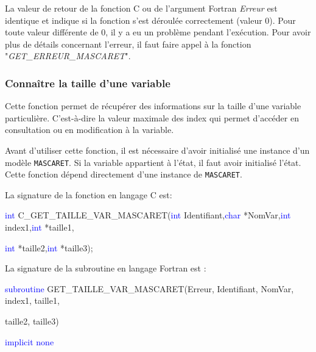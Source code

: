 \documentclass[a4paper,11pt]{article}
\begin{document}
 \vspace{0.5cm}
 
 La valeur de retour de la fonction C ou de l'argument Fortran \textit{Erreur} est identique et indique si la fonction s'est d\'eroul\'ee correctement (valeur 0). Pour toute valeur diff\'erente de 0, il y a eu un probl\`eme pendant l'ex\'ecution. Pour avoir plus de d\'etails concernant l'erreur, il faut faire appel \`a la fonction "\textit{GET\_ERREUR\_MASCARET}".

\subsubsection{Conna\^itre la taille d'une variable}

 Cette fonction permet de r\'ecup\'erer des informations sur la taille d'une variable particuli\`ere. C'est-\`a-dire la valeur maximale des index qui permet d'acc\'eder en consultation ou en modification \`a la variable.
 
 \vspace{0.5cm}
 
 Avant d'utiliser cette fonction, il est n\'ecessaire d'avoir initialis\'e une instance d'un mod\`ele \texttt{MASCARET}. Si la variable appartient \`a l'\'etat, il faut avoir initialis\'e l'\'etat. Cette fonction d\'epend directement d'une instance de \texttt{MASCARET}.
 
 \vspace{0.5cm}
 
 La signature de la fonction en langage C est:
 
 \vspace{0.5cm}
 
 \textcolor{blue}{int} C\_GET\_TAILLE\_VAR\_MASCARET(\textcolor{blue}{int} Identifiant,\textcolor{blue}{char} *NomVar,\textcolor{blue}{int} index1,\textcolor{blue}{int} *taille1,
 
 \textcolor{blue}{int} *taille2,\textcolor{blue}{int} *taille3);
 
 \vspace{0.5cm} 

  La signature de la subroutine en langage Fortran est :
 
 \vspace{0.5cm}
 
    \textcolor{blue}{subroutine} GET\_TAILLE\_VAR\_MASCARET(Erreur, Identifiant, NomVar, index1, taille1,
    
     taille2, taille3)
    
        \hspace{1cm}\textcolor{blue}{implicit none}                 
        
\end{document}
